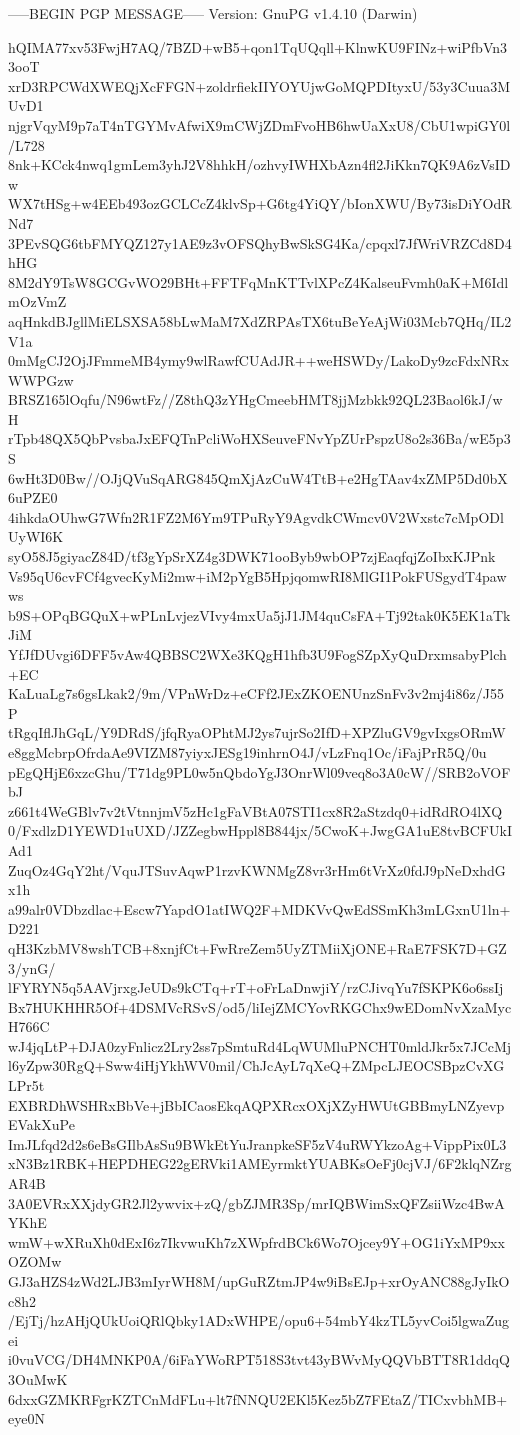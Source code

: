 -----BEGIN PGP MESSAGE-----
Version: GnuPG v1.4.10 (Darwin)

hQIMA77xv53FwjH7AQ/7BZD+wB5+qon1TqUQqll+KlnwKU9FINz+wiPfbVn33ooT
xrD3RPCWdXWEQjXcFFGN+zoldrfiekIIYOYUjwGoMQPDItyxU/53y3Cuua3MUvD1
njgrVqyM9p7aT4nTGYMvAfwiX9mCWjZDmFvoHB6hwUaXxU8/CbU1wpiGY0l/L728
8nk+KCck4nwq1gmLem3yhJ2V8hhkH/ozhvyIWHXbAzn4fl2JiKkn7QK9A6zVsIDw
WX7tHSg+w4EEb493ozGCLCcZ4klvSp+G6tg4YiQY/bIonXWU/By73isDiYOdRNd7
3PEvSQG6tbFMYQZ127y1AE9z3vOFSQhyBwSkSG4Ka/cpqxl7JfWriVRZCd8D4hHG
8M2dY9TsW8GCGvWO29BHt+FFTFqMnKTTvlXPcZ4KalseuFvmh0aK+M6IdlmOzVmZ
aqHnkdBJgllMiELSXSA58bLwMaM7XdZRPAsTX6tuBeYeAjWi03Mcb7QHq/IL2V1a
0mMgCJ2OjJFmmeMB4ymy9wlRawfCUAdJR++weHSWDy/LakoDy9zcFdxNRxWWPGzw
BRSZ165lOqfu/N96wtFz//Z8thQ3zYHgCmeebHMT8jjMzbkk92QL23Baol6kJ/wH
rTpb48QX5QbPvsbaJxEFQTnPcliWoHXSeuveFNvYpZUrPspzU8o2s36Ba/wE5p3S
6wHt3D0Bw//OJjQVuSqARG845QmXjAzCuW4TtB+e2HgTAav4xZMP5Dd0bX6uPZE0
4ihkdaOUhwG7Wfn2R1FZ2M6Ym9TPuRyY9AgvdkCWmcv0V2Wxstc7cMpODlUyWI6K
syO58J5giyacZ84D/tf3gYpSrXZ4g3DWK71ooByb9wbOP7zjEaqfqjZoIbxKJPnk
Vs95qU6cvFCf4gvecKyMi2mw+iM2pYgB5HpjqomwRI8MlGI1PokFUSgydT4pawws
b9S+OPqBGQuX+wPLnLvjezVIvy4mxUa5jJ1JM4quCsFA+Tj92tak0K5EK1aTkJiM
YfJfDUvgi6DFF5vAw4QBBSC2WXe3KQgH1hfb3U9FogSZpXyQuDrxmsabyPlch+EC
KaLuaLg7s6gsLkak2/9m/VPnWrDz+eCFf2JExZKOENUnzSnFv3v2mj4i86z/J55P
tRgqIflJhGqL/Y9DRdS/jfqRyaOPhtMJ2ys7ujrSo2IfD+XPZluGV9gvIxgsORmW
e8ggMcbrpOfrdaAe9VIZM87yiyxJESg19inhrnO4J/vLzFnq1Oc/iFajPrR5Q/0u
pEgQHjE6xzcGhu/T71dg9PL0w5nQbdoYgJ3OnrWl09veq8o3A0cW//SRB2oVOFbJ
z661t4WeGBlv7v2tVtnnjmV5zHc1gFaVBtA07STI1cx8R2aStzdq0+idRdRO4lXQ
0/FxdlzD1YEWD1uUXD/JZZegbwHppl8B844jx/5CwoK+JwgGA1uE8tvBCFUkIAd1
ZuqOz4GqY2ht/VquJTSuvAqwP1rzvKWNMgZ8vr3rHm6tVrXz0fdJ9pNeDxhdGx1h
a99alr0VDbzdlac+Escw7YapdO1atIWQ2F+MDKVvQwEdSSmKh3mLGxnU1ln+D221
qH3KzbMV8wshTCB+8xnjfCt+FwRreZem5UyZTMiiXjONE+RaE7FSK7D+GZ3/ynG/
lFYRYN5q5AAVjrxgJeUDs9kCTq+rT+oFrLaDnwjiY/rzCJivqYu7fSKPK6o6ssIj
Bx7HUKHHR5Of+4DSMVcRSvS/od5/liIejZMCYovRKGChx9wEDomNvXzaMycH766C
wJ4jqLtP+DJA0zyFnlicz2Lry2ss7pSmtuRd4LqWUMluPNCHT0mldJkr5x7JCcMj
l6yZpw30RgQ+Sww4iHjYkhWV0mil/ChJcAyL7qXeQ+ZMpcLJEOCSBpzCvXGLPr5t
EXBRDhWSHRxBbVe+jBbICaosEkqAQPXRcxOXjXZyHWUtGBBmyLNZyevpEVakXuPe
ImJLfqd2d2s6eBsGIlbAsSu9BWkEtYuJranpkeSF5zV4uRWYkzoAg+VippPix0L3
xN3Bz1RBK+HEPDHEG22gERVki1AMEyrmktYUABKsOeFj0cjVJ/6F2klqNZrgAR4B
3A0EVRxXXjdyGR2Jl2ywvix+zQ/gbZJMR3Sp/mrIQBWimSxQFZsiiWzc4BwAYKhE
wmW+wXRuXh0dExI6z7IkvwuKh7zXWpfrdBCk6Wo7Ojcey9Y+OG1iYxMP9xxOZOMw
GJ3aHZS4zWd2LJB3mIyrWH8M/upGuRZtmJP4w9iBsEJp+xrOyANC88gJyIkOc8h2
/EjTj/hzAHjQUkUoiQRlQbky1ADxWHPE/opu6+54mbY4kzTL5yvCoi5lgwaZugei
i0vuVCG/DH4MNKP0A/6iFaYWoRPT518S3tvt43yBWvMyQQVbBTT8R1ddqQ3OuMwK
6dxxGZMKRFgrKZTCnMdFLu+lt7fNNQU2EKl5Kez5bZ7FEtaZ/TICxvbhMB+eye0N
